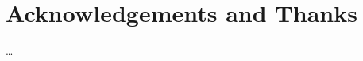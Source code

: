 \documentclass[12pt,twoside,openright]{book}
\begin{document}

\chapter*{Acknowledgements and Thanks}

\ldots


\tableofcontents

{}
{}
{}
{}
{}
{}
{}
{}
{}
{}



\end{document}
